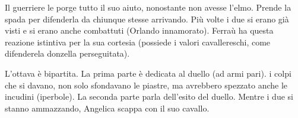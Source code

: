 \documentclass[a4paper]{article}
\begin{document}
Il guerriere le porge tutto il suo aiuto, nonostante non avesse l'elmo.
Prende la spada per difenderla da chiunque stesse arrivando.
Più volte i due si erano già visti e si erano anche combattuti (Orlando innamorato).
Ferraù ha questa reazione istintiva per la sua cortesia (possiede i valori cavallereschi,
come difenderela donzella perseguitata).

\begin{center} %
\begin{minipage}{0.5\textwidth}
\centering
{}
\end{minipage}
\end{center}

L'ottava è bipartita. La prima parte è dedicata al duello (ad armi pari).
i colpi che si davano, non solo sfondavano le piastre,
ma avrebbero spezzato anche le incudini (iperbole).
La seconda parte parla dell'esito del duello.
Mentre i due si stanno ammazzando, Angelica scappa con il suo cavallo.

\begin{center} %
\begin{minipage}{0.5\textwidth}
\centering
{}
\end{minipage}
\end{center}
\end{document}
